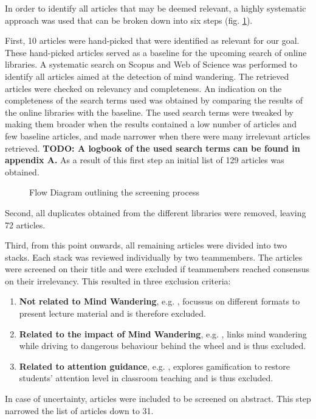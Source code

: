 
In order to identify all articles that may be deemed relevant, a highly systematic approach was used that can be broken down into six steps (fig. \ref{fig:prisma}).

First, 10 articles were hand-picked that were identified as relevant for our goal. These hand-picked articles served as a baseline for the upcoming search of online libraries.
A systematic search on Scopus and Web of Science was performed to identify all articles aimed at the detection of mind wandering. The retrieved articles were checked on relevancy and completeness.
An indication on the completeness of the search terms used was obtained by comparing the results of the online libraries with the baseline. 
The used search terms were tweaked by making them broader when the results contained a low number of articles and few baseline articles, and made narrower when there were many irrelevant articles retrieved.
\textbf{TODO: A logbook of the used search terms can be found in appendix A.}
As a result of this first step an initial list of 129 articles was obtained.

\begin{figure}
  \resizebox{\columnwidth}{!}{}
\caption{Flow Diagram outlining the screening process}
\label{fig:prisma}
\end{figure}

Second, all duplicates obtained from the different libraries were removed, leaving 72 articles.

Third, from this point onwards, all remaining articles were divided into two stacks. Each stack was reviewed individually by two teammembers.
The articles were screened on their title and were excluded if teammembers reached consensus on their irrelevancy. 
This resulted in three exclusion criteria:
\begin{enumerate}
    \item \textbf{Not related to Mind Wandering}, e.g. \cite{ISI:000432512400017}, focussus on different formats to present lecture material and is therefore excluded.
    \item \textbf{Related to the impact of Mind Wandering}, e.g. \cite{Albert2018LinkingDrivers}, links mind wandering while driving to dangerous behaviour behind the wheel and is thus excluded.
    \item \textbf{Related to attention guidance}, e.g. \cite{Xiao2018ClassroomMechanism}, explores gamification to restore students' attention level in classroom teaching and is thus excluded.
  \end{enumerate}
In case of uncertainty, articles were included to be screened on abstract. This step narrowed the list of articles down to 31.


